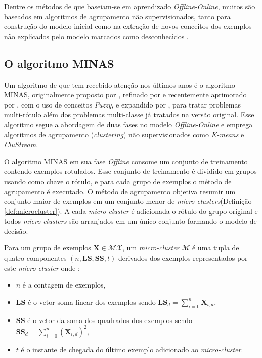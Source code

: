 Dentre os métodos de \nd que baseiam-se em aprendizado \emph{Offline-Online},
muitos são baseados em algoritmos de agrupamento não supervisionados, tanto
para construção do modelo inicial como na extração de novos conceitos dos
exemplos não explicados pelo modelo marcados como desconhecidos
\cite{Spinosa2009ollinda,Masud2010ECSMiner,Faria2013}.

\subsection{O algoritmo MINAS}\label{sec:minas-og}

Um algoritmo de \nd que tem recebido atenção nos últimos anos é o algoritmo
MINAS, originalmente proposto por , refinado por
 e recentemente aprimorado por
, com o uso de conceitos \emph{Fuzzy}, e expandido por
, para tratar problemas multi-rótulo além dos problemas
multi-classe já tratados na versão original.
Esse algoritmo segue a abordagem de duas fases no modelo \emph{Offline-Online} e
emprega algoritmos de agrupamento (\emph{clustering}) não supervisionados como
\emph{K-means} e \emph{CluStream}.

\newcommand{\mcluster}{\emph{micro-cluster}\xspace}
\newcommand{\mclusters}{\emph{micro-clusters}\xspace}

O algoritmo MINAS em sua fase \emph{Offline} consome um conjunto de treinamento
contendo exemplos rotulados.
Esse conjunto de treinamento é dividido em grupos usando como chave o rótulo,
e para cada grupo de exemplos o método de agrupamento é executado.
O método de agrupamento objetiva resumir um conjunto maior de exemplos em um
conjunto menor de \mclusters (Definição \ref{def:microcluster}).
A cada \mcluster é adicionada o rótulo do grupo original e todos \mclusters
são arranjados em um único conjunto formando o modelo de decisão.

\begin{definition}
  Para um grupo de exemplos $\mathbf{X} \in \mathcal{MX}$, um \mcluster
  $\mathcal{M}$ é uma tupla de quatro componentes $(n, \mathbf{LS}, \mathbf{SS}, t)$
  derivados dos exemplos representados por este \mcluster onde \cite{Aggarwal2003,Faria2016minas}:
  \begin{itemize}
    \item $n$ é a contagem de exemplos,
    \item $\mathbf{LS}$ é o vetor soma linear dos exemplos sendo $\mathbf{LS}_d = \sum_{i=0}^{n} \mathbf{X}_{i,d}$,
    \item $\mathbf{SS}$ é o vetor da soma dos quadrados dos exemplos sendo $\mathbf{SS}_d = \sum_{i=0}^{n} (\mathbf{X}_{i,d})^2$,
    \item $t$ é o instante de chegada do último exemplo adicionado ao \mcluster.
  \end{itemize}
  \label{def:microcluster}
\end{definition}

